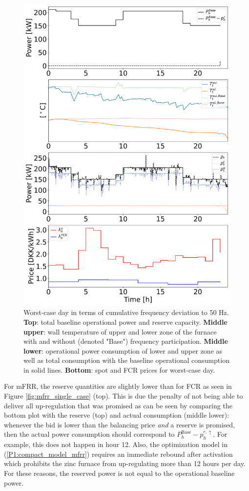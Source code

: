 \documentclass[lettersize,journal]{IEEEtran}
\begin{document}
\begin{figure}[t]
    \centering
    \includegraphics[width=\columnwidth]{figures/fcr_single_case.png}
    \caption{Worst-case day in terms of cumulative frequency deviation to 50 Hz. \textbf{Top}: total baseline operational power and reserve capacity. \textbf{Middle upper}: wall temperature of upper and lower zone of the furnace with and without (denoted "Base") frequency participation. \textbf{Middle lower}: operational power consumption of lower and upper zone as well as total consumption with the baseline operational consumption in solid lines. \textbf{Bottom}: spot and FCR prices for worst-case day.}
    \label{fig:fcr_single_case}
\end{figure}

For mFRR, the reserve quantities are slightly lower than for FCR as seen in Figure \ref{fig:mfrr_single_case} (top). This is due the penalty of not being able to deliver all up-regulation that was promised as can be seen by comparing the bottom plot with the reserve (top) and actual consumption (middle lower): whenever the bid is lower than the balancing price \textit{and} a reserve is promised, then the actual power consumption should correspond to $P^{\text{Base}}_{h} - p_{h}^{r, \uparrow}$. For example, this does not happen in hour 12. Also, the optimization model in (\ref{P1:compact_model_mfrr}) requires an immediate rebound after activation which prohibits the zinc furnace from up-regulating more than 12 hours per day. For these reasons, the reserved power is not equal to the operational baseline power.
\end{document}

